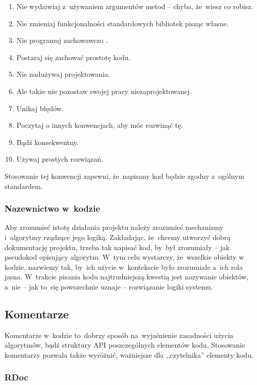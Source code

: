 \begin{enumerate}
\begin{enumerate}
    \item Nie wydziwiaj z~używaniem argumentów metod -- chyba, że~wiesz co robisz.
    \item Nie zmieniaj funkcjonalności standardowych bibliotek pisząc własne.
    \item Nie programuj zachowawczo \cite{zachowawcze}.
    \item Postaraj się zachować prostotę kodu.
    \item Nie nadużywaj projektowania.
    \item Ale także nie pozostaw swojej pracy niezaprojektowanej.
    \item Unikaj błędów.
    \item Poczytaj o innych konwencjach, aby móc rozwinąć tę.
    \item Bądź konsekwentny.
    \item Używaj prostych rozwiązań.
  \end{enumerate}
\end{enumerate}

Stosowanie tej konwencji zapewni, że~napisany kod będzie zgodny z~ogólnym standardem.

\subsubsection{Nazewnictwo w~kodzie} \label{dokumentacja.nazewnictwo}

Aby zrozumieć istotę działania projektu należy zrozumieć mechanizmy i~algorytmy rządzące jego logiką. Zakładając, że~chcemy utworzyć dobrą dokumentację projektu, trzeba tak napisać kod, by~był zrozumiały -- jak pseudokod opisujący algorytm. W~tym celu wystarczy, że~wszelkie obiekty w~ kodzie, nazwiemy tak, by~ich użycie w~kontekscie było zrozumiałe a~ich rola jasna. W~trakcie pisania kodu najtrudniejszą kwestią jest nazywanie obiektów, a~nie -- jak to~się powszechnie uznaje -- rozwiązanie logiki systemu.

\subsection{Komentarze} \label{dokumentacja.komentarze}

Komentarze w~kodzie to~dobrzy sposób na~wyjaśnienie zasadności użycia algorytmów, bądź struktury API poszczególnych elementów kodu. Stosowanie komentarzy pozwala także wyróżnić, ważniejsze dla ,,czytelnika'' elementy kodu.

\subsubsection{RDoc} \label{dokumentacja.rdoc}

